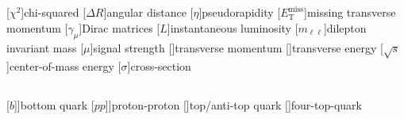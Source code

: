 \documentclass[thesis.tex]{subfiles}
\begin{document}
\begin{abbrev}

\subsection*{}
\begin{acronym}
	[$\chi^2$]{chi-squared}
	[$\Delta R$]{angular distance}
	[\ensuremath{\eta}\xspace]{pseudorapidity}
	[\ensuremath{E_\mathrm{T}^\mathrm{miss}}\xspace]{missing transverse momentum}
	[$\gamma_\mu$]{Dirac matrices}
	[$L$]{instantaneous luminosity}
	[$m_{\ell\ell}$]{dilepton invariant mass}
	[$\mu$]{signal strength}
	[\pT]{transverse momentum}
	[\ET]{transverse energy}
	[\ensuremath{\sqrt{s}}\xspace]{center-of-mass energy}
	[\ensuremath{\sigma}\xspace]{cross-section}
\end{acronym}

\subsection*{}
\begin{acronym}
[\ensuremath{b}\xspace]]{bottom quark}
[\ensuremath{pp}\xspace]]{proton-proton}
[\ttbar]{top/anti-top quark}
[\tttt]{four-top-quark}
\end{acronym}


\end{abbrev}
\end{document}
